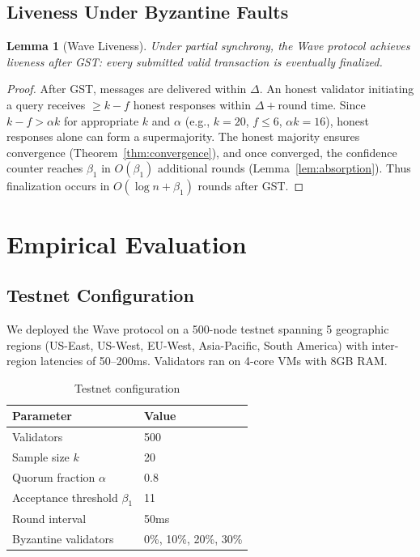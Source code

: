 \documentclass[11pt,a4paper]{article}
\newtheorem{lemma}[theorem]{Lemma}
\begin{document}
\subsection{Liveness Under Byzantine Faults}

\begin{lemma}[Wave Liveness]
\label{lem:liveness}
Under partial synchrony, the Wave protocol achieves liveness after GST: every submitted
valid transaction is eventually finalized.
\end{lemma}

\begin{proof}
After GST, messages are delivered within $\Delta$. An honest validator initiating a query
receives $\geq k - f$ honest responses within $\Delta + \text{round time}$. Since
$k - f > \alpha k$ for appropriate $k$ and $\alpha$ (e.g., $k = 20$, $f \leq 6$, $\alpha k = 16$),
honest responses alone can form a supermajority. The honest majority ensures convergence
(Theorem~\ref{thm:convergence}), and once converged, the confidence counter reaches $\beta_1$
in $O(\beta_1)$ additional rounds (Lemma~\ref{lem:absorption}). Thus finalization occurs
in $O(\log n + \beta_1)$ rounds after GST.
\end{proof}

\section{Empirical Evaluation}
\label{sec:evaluation}

\subsection{Testnet Configuration}

We deployed the Wave protocol on a 500-node testnet spanning 5 geographic regions
(US-East, US-West, EU-West, Asia-Pacific, South America) with inter-region latencies
of 50--200ms. Validators ran on 4-core VMs with 8GB RAM.

\begin{table}[h]
\centering
\begin{tabular}{@{}ll@{}}
\toprule
\textbf{Parameter} & \textbf{Value} \\
\midrule
Validators & 500 \\
Sample size $k$ & 20 \\
Quorum fraction $\alpha$ & 0.8 \\
Acceptance threshold $\beta_1$ & 11 \\
Round interval & 50ms \\
Byzantine validators & 0\%, 10\%, 20\%, 30\% \\
\bottomrule
\end{tabular}
\caption{Testnet configuration}
\label{tab:testnet}
\end{table}
\end{document}
